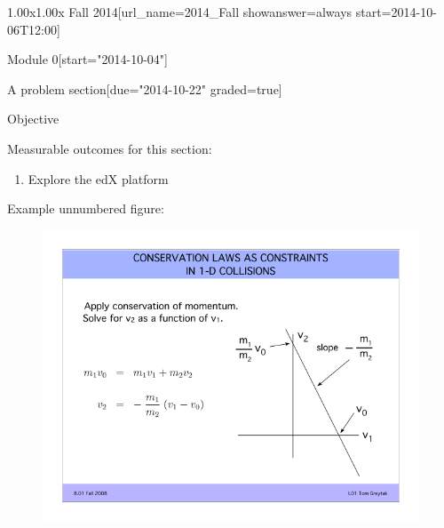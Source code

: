 \documentclass[12pt]{article}
\begin{document}
\begin{edXcourse}{1.00x}{1.00x Fall 2014}[url_name=2014_Fall showanswer=always start=2014-10-06T12:00]

\begin{edXchapter*}{Module 0}[start="2014-10-04"]

\begin{edXsequential}{A problem section}[due="2014-10-22" graded=true]

\begin{edXtext}{Objective}

Measurable outcomes for this section:
\begin{enumerate}
  \item {} Explore the edX platform
\end{enumerate}

Example unnumbered figure:
\begin{figure}
  \begin{center}
    \includegraphics{example-image}
  \end{center}
\end{figure}


\end{edXtext}
\end{edXsequential}
\end{edXchapter*}
\end{edXcourse}
\end{document}
